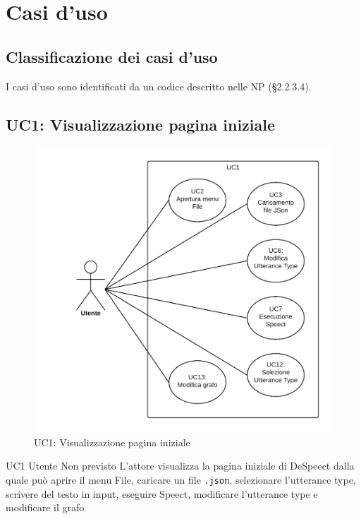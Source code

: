 \documentclass[../AnalisideiRequisiti.tex]{subfiles}
\begin{document}

	\chapter{Casi d'uso}
	\section{Classificazione dei casi d'uso}
	I casi d'uso sono identificati da un codice descritto nelle NP (§2.2.3.4). 
	
 	
	\section{UC1: Visualizzazione pagina iniziale}
	\begin{figure}[H]
 
		\centering
 
		\includegraphics[width=\textwidth]{../img/UC1.png}
 
		\caption{UC1: Visualizzazione pagina iniziale}
 
	\end{figure}
	\UserCase
	{UC1}
	{Utente}
	{Non previsto}
	{L'attore visualizza la pagina iniziale di DeSpeect dalla quale può aprire il menu File, caricare un file \verb|.json|, selezionare l'utterance type, scrivere del testo in input, eseguire Speect, modificare l'utterance type e modificare il grafo}
\end{document}
